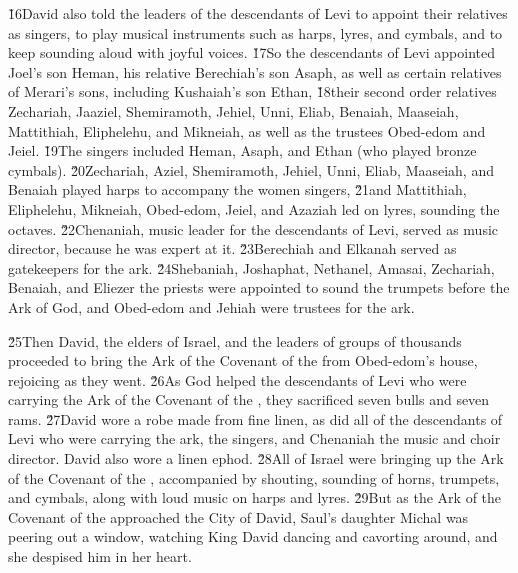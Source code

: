 \v{16}David also told the leaders of the descendants of Levi to appoint their relatives as singers, to play musical instruments such as harps, lyres, and cymbals, and to keep sounding aloud with joyful voices. \v{17}So the descendants of Levi appointed Joel's son Heman, his relative Berechiah's son Asaph, as well as certain relatives of Merari's sons, including Kushaiah's son Ethan, \v{18}their second order relatives Zechariah, Jaaziel, Shemiramoth, Jehiel, Unni, Eliab, Benaiah, Maaseiah, Mattithiah, Eliphelehu, and Mikneiah, as well as the trustees Obed-edom and Jeiel. \v{19}The singers included Heman, Asaph, and Ethan (who played bronze cymbals). \v{20}Zechariah, Aziel, Shemiramoth, Jehiel, Unni, Eliab, Maaseiah, and Benaiah played harps to accompany the women singers, \v{21}and Mattithiah, Eliphelehu, Mikneiah, Obed-edom, Jeiel, and Azaziah led on lyres, sounding the octaves. \v{22}Chenaniah, music leader for the descendants of Levi, served as music director, because he was expert at it. \v{23}Berechiah and Elkanah served as gatekeepers for the ark. \v{24}Shebaniah, Joshaphat, Nethanel, Amasai, Zechariah, Benaiah, and Eliezer the priests were appointed to sound the trumpets before the Ark of God, and Obed-edom and Jehiah were trustees for the ark.

\v{25}Then David, the elders of Israel, and the leaders of groups of thousands proceeded to bring the Ark of the Covenant of the  from Obed-edom's house, rejoicing as they went. \v{26}As God helped the descendants of Levi who were carrying the Ark of the Covenant of the , they sacrificed seven bulls and seven rams. \v{27}David wore a robe made from fine linen, as did all of the descendants of Levi who were carrying the ark, the singers, and Chenaniah the music and choir director. David also wore a linen ephod. \v{28}All of Israel were bringing up the Ark of the Covenant of the , accompanied by shouting, sounding of horns, trumpets, and cymbals, along with loud music on harps and lyres. \v{29}But as the Ark of the Covenant of the  approached the City of David, Saul's daughter Michal was peering out a window, watching King David dancing and cavorting around, and she despised him in her heart.

